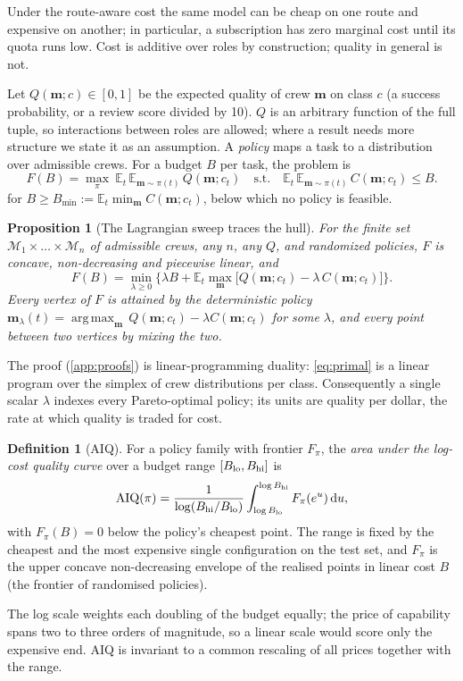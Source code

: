 \documentclass[11pt,a4paper]{article}
\newtheorem{proposition}{Proposition}
\theoremstyle{definition}
\newtheorem{definition}{Definition}
\theoremstyle{remark}
\theoremstyle{definition}
\newcommand{\E}{\mathbb{E}}
\newcommand{\mods}{\mathcal{M}}
\newcommand{\crew}{\mathbf{m}}
\newcommand{\AIQ}{\mathrm{AIQ}}
\newcommand{\dd}{\,\mathrm{d}}
\DeclareMathOperator*{\argmax}{arg\,max}
\begin{document}
Under the route-aware cost the same model can be cheap on one route and expensive on another; in particular, a subscription has zero marginal cost until its quota runs low. Cost is additive over roles by construction; quality in general is not.

Let $Q(\crew;c)\in[0,1]$ be the expected quality of crew $\crew$ on class $c$ (a success probability, or a review score divided by 10). $Q$ is an arbitrary function of the full tuple, so interactions between roles are allowed; where a result needs more structure we state it as an assumption. A \emph{policy} maps a task to a distribution over admissible crews. For a budget $B$ per task, the problem is
\begin{equation}
F(B)=\max_{\pi}\ \E_{t}\,\E_{\crew\sim\pi(t)}\,Q(\crew;c_t)\quad\text{s.t.}\quad \E_t\,\E_{\crew\sim\pi(t)}\,C(\crew;c_t)\le B.
\label{eq:primal}
\end{equation}
for $B\ge B_{\min}:=\E_t\min_\crew C(\crew;c_t)$, below which no policy is feasible.

\begin{proposition}[The Lagrangian sweep traces the hull]
\label{prop:duality}
For the finite set $\mods_1\times\dots\times\mods_n$ of admissible crews, any $n$, any $Q$, and randomized policies, $F$ is concave, non-decreasing and piecewise linear, and
\[
F(B)=\min_{\lambda\ge0}\Big\{\lambda B+\E_t\max_{\crew}\big[Q(\crew;c_t)-\lambda\,C(\crew;c_t)\big]\Big\}.
\]
Every vertex of $F$ is attained by the deterministic policy $\crew_\lambda(t)=\argmax_{\crew}\,Q(\crew;c_t)-\lambda C(\crew;c_t)$ for some $\lambda$, and every point between two vertices by mixing the two.
\end{proposition}
The proof (\cref{app:proofs}) is linear-programming duality: \eqref{eq:primal} is a linear program over the simplex of crew distributions per class. Consequently a single scalar $\lambda$ indexes every Pareto-optimal policy; its units are quality per dollar, the rate at which quality is traded for cost.


\begin{definition}[AIQ]
For a policy family with frontier $F_\pi$, the \emph{area under the log-cost quality curve} over a budget range $[B_{\rm lo},B_{\rm hi}]$ is
\begin{equation}
\AIQ(\pi)=\frac{1}{\log(B_{\rm hi}/B_{\rm lo})}\int_{\log B_{\rm lo}}^{\log B_{\rm hi}} F_\pi(e^u)\dd u ,
\label{eq:aiq}
\end{equation}
with $F_\pi(B)=0$ below the policy's cheapest point. The range is fixed by the cheapest and the most expensive single configuration on the test set, and $F_\pi$ is the upper concave non-decreasing envelope of the realised points in linear cost $B$ (the frontier of randomised policies).
\end{definition}
The log scale weights each doubling of the budget equally; the price of capability spans two to three orders of magnitude, so a linear scale would score only the expensive end. AIQ is invariant to a common rescaling of all prices together with the range.
\end{document}
